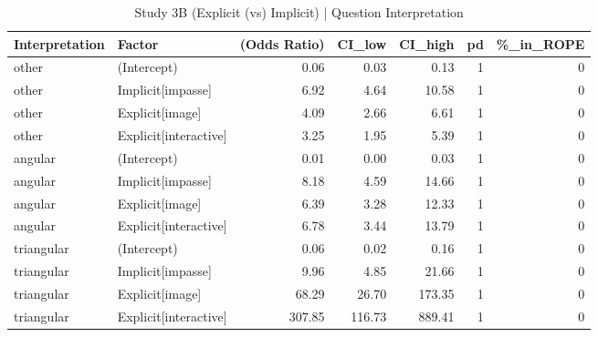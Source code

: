 \begin{table}

\caption{Study 3B (Explicit (vs) Implicit) | Question Interpretation }
\centering
\begin{tabular}[t]{l|l|r|r|r|r|r}
\hline
Interpretation & Factor & (Odds Ratio) & CI\_low & CI\_high & pd & \%\_in\_ROPE\\
\hline
other & (Intercept) & 0.06 & 0.03 & 0.13 & 1 & 0\\
\hline
other & Implicit[impasse] & 6.92 & 4.64 & 10.58 & 1 & 0\\
\hline
other & Explicit[image] & 4.09 & 2.66 & 6.61 & 1 & 0\\
\hline
other & Explicit[interactive] & 3.25 & 1.95 & 5.39 & 1 & 0\\
\hline
angular & (Intercept) & 0.01 & 0.00 & 0.03 & 1 & 0\\
\hline
angular & Implicit[impasse] & 8.18 & 4.59 & 14.66 & 1 & 0\\
\hline
angular & Explicit[image] & 6.39 & 3.28 & 12.33 & 1 & 0\\
\hline
angular & Explicit[interactive] & 6.78 & 3.44 & 13.79 & 1 & 0\\
\hline
triangular & (Intercept) & 0.06 & 0.02 & 0.16 & 1 & 0\\
\hline
triangular & Implicit[impasse] & 9.96 & 4.85 & 21.66 & 1 & 0\\
\hline
triangular & Explicit[image] & 68.29 & 26.70 & 173.35 & 1 & 0\\
\hline
triangular & Explicit[interactive] & 307.85 & 116.73 & 889.41 & 1 & 0\\
\hline
\end{tabular}
\end{table}
